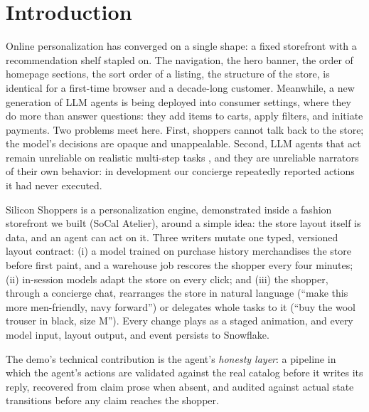 \documentclass[sigconf, screen, review]{acmart}
\begin{document}


\maketitle

\section{Introduction}

Online personalization has converged on a single shape: a fixed storefront with a recommendation shelf stapled on. The navigation, the hero banner, the order of homepage sections, the sort order of a listing, the structure of the store, is identical for a first-time browser and a decade-long customer. Meanwhile, a new generation of LLM agents is being deployed into consumer settings, where they do more than answer questions: they add items to carts, apply filters, and initiate payments. Two problems meet here. First, shoppers cannot talk back to the store; the model's decisions are opaque and unappealable. Second, LLM agents that act remain unreliable on realistic multi-step tasks \cite{taubench, webarena}, and they are unreliable narrators of their own behavior: in development our concierge repeatedly reported actions it had never executed.

Silicon Shoppers is a personalization engine, demonstrated inside a fashion storefront we built (SoCal Atelier), around a simple idea: the store layout itself is data, and an agent can act on it. Three writers mutate one typed, versioned layout contract: (i) a model trained on purchase history merchandises the store before first paint, and a warehouse job rescores the shopper every four minutes; (ii) in-session models adapt the store on every click; and (iii) the shopper, through a concierge chat, rearranges the store in natural language (``make this more men-friendly, navy forward'') or delegates whole tasks to it (``buy the wool trouser in black, size M''). Every change plays as a staged animation, and every model input, layout output, and event persists to Snowflake.

The demo's technical contribution is the agent's \emph{honesty layer}: a pipeline in which the agent's actions are validated against the real catalog before it writes its reply, recovered from claim prose when absent, and audited against actual state transitions before any claim reaches the shopper.
\end{document}
